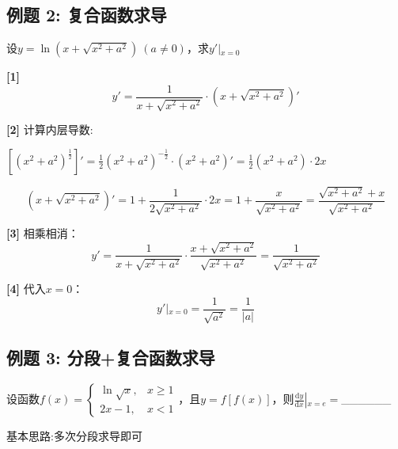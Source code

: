 \documentclass[11pt,a4paper,UTF8]{ctexart}
\begin{document}
\subsection{例题 2: 复合函数求导}

设$y = \ln(x + \sqrt{x^2+a^2})\ (a \neq 0)$，求$y'\big\vert{}_{x=0}$

\begin{solbox}[分步推导与答题规范]
\textbf{[1]} 
\begin{equation*}
y' = \frac{1}{x + \sqrt{x^2+a^2}} \cdot \left(x + \sqrt{x^2+a^2}\right)'
\end{equation*}


\textbf{[2]} 计算内层导数:

  	$[(x^2+a^2)^{\frac{1}{2}}]' = \frac{1}{2}(x^2+a^2)^{-\frac{1}{2}}\cdot (x^2+a^2)'= \frac{1}{2}(x^2+a^2)\cdot 2x$

  	
\begin{equation*}
\left(x + \sqrt{x^2+a^2}\right)'  = 1 + \frac{1}{2\sqrt{x^2+a^2}} \cdot 2x = 1 + \frac{x}{\sqrt{x^2+a^2}} = \frac{\sqrt{x^2+a^2} + x}{\sqrt{x^2+a^2}}
\end{equation*}


\textbf{[3]} 相乘相消：
\begin{equation*}
y' = \frac{1}{x + \sqrt{x^2+a^2}} \cdot \frac{x + \sqrt{x^2+a^2}}{\sqrt{x^2+a^2}} = \frac{1}{\sqrt{x^2+a^2}}
\end{equation*}


\textbf{[4]} 代入$x=0$：
\begin{equation*}
y'\big\vert{}_{x=0} = \frac{1}{\sqrt{a^2}} = \frac{1}{\vert{}a\vert{}}
\end{equation*}

\end{solbox}


\subsection{例题 3: 分段+复合函数求导}

设函数$f(x) = \begin{cases} \ln\sqrt{x}, & x \ge 1 \\ 2x - 1, & x < 1 \end{cases}$，且$y = f[f(x)]$，则$\left.\frac{\mathrm{d}y}{\mathrm{d}x}\right\vert{}_{x=e} =$\_\_\_\_\_\_

基本思路:多次分段求导即可
\end{document}
